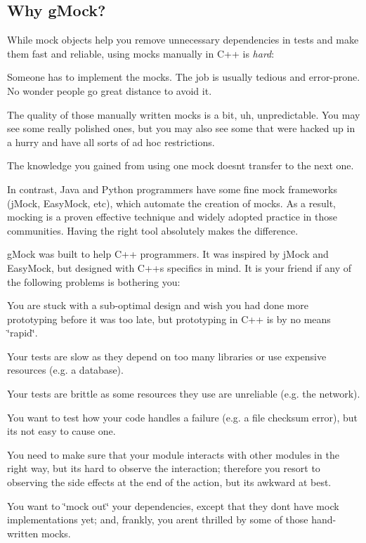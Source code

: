 \subsection*{Why g\+Mock?}

While mock objects help you remove unnecessary dependencies in tests and make them fast and reliable, using mocks manually in C++ is {\itshape hard}\+:


\begin{DoxyItemize}
\item Someone has to implement the mocks. The job is usually tedious and error-\/prone. No wonder people go great distance to avoid it.
\item The quality of those manually written mocks is a bit, uh, unpredictable. You may see some really polished ones, but you may also see some that were hacked up in a hurry and have all sorts of ad hoc restrictions.
\item The knowledge you gained from using one mock doesn\textquotesingle{}t transfer to the next one.
\end{DoxyItemize}

In contrast, Java and Python programmers have some fine mock frameworks (j\+Mock, Easy\+Mock, etc), which automate the creation of mocks. As a result, mocking is a proven effective technique and widely adopted practice in those communities. Having the right tool absolutely makes the difference.

g\+Mock was built to help C++ programmers. It was inspired by j\+Mock and Easy\+Mock, but designed with C++\textquotesingle{}s specifics in mind. It is your friend if any of the following problems is bothering you\+:


\begin{DoxyItemize}
\item You are stuck with a sub-\/optimal design and wish you had done more prototyping before it was too late, but prototyping in C++ is by no means \char`\"{}rapid\char`\"{}.
\item Your tests are slow as they depend on too many libraries or use expensive resources (e.\+g. a database).
\item Your tests are brittle as some resources they use are unreliable (e.\+g. the network).
\item You want to test how your code handles a failure (e.\+g. a file checksum error), but it\textquotesingle{}s not easy to cause one.
\item You need to make sure that your module interacts with other modules in the right way, but it\textquotesingle{}s hard to observe the interaction; therefore you resort to observing the side effects at the end of the action, but it\textquotesingle{}s awkward at best.
\item You want to \char`\"{}mock out\char`\"{} your dependencies, except that they don\textquotesingle{}t have mock implementations yet; and, frankly, you aren\textquotesingle{}t thrilled by some of those hand-\/written mocks.
\end{DoxyItemize}

